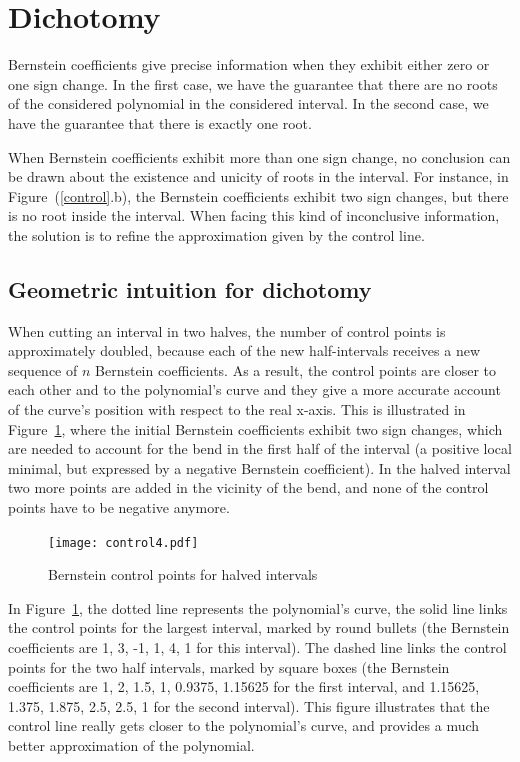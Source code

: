 \documentclass{mscs}
\begin{document}
\section{Dichotomy}

\label{sec:dicho}
Bernstein coefficients give precise information when they exhibit
either zero or one sign change. In the first case, we have the
guarantee that there are no roots of the considered polynomial in the
considered interval. In the second case, we have the guarantee that
there is exactly one root.

When Bernstein coefficients exhibit more than one sign change, no
conclusion can be drawn about the existence and unicity of roots in the
interval.  For instance, in Figure~(\ref{control}.b), the Bernstein
coefficients exhibit two sign changes, but there is no root inside the
interval.  When facing this kind of inconclusive information, the solution
is to refine the approximation given by the control line.

\subsection{Geometric intuition for dichotomy}
\label{ssec:dichogeom}
When cutting an interval in two halves, the number of control points is
approximately doubled, because each of the new half-intervals receives a
new sequence of \(n\) Bernstein coefficients.  As a result, the control points
are closer to each other and to the polynomial's curve and they give a more
accurate account of the curve's position with respect to the real
x-axis.  This is
illustrated in Figure~\ref{dichotomy-curve}, where the initial Bernstein
coefficients exhibit two sign changes, which are needed to account for the bend
in the first half of the interval (a positive local minimal, but expressed
by a negative Bernstein coefficient).  In the halved interval two more points
are added in the vicinity of the bend, and none of the control points have
to be negative anymore.
\begin{figure}
\begin{center}
\texttt{[image: control4.pdf]}
\caption{\label{dichotomy-curve}Bernstein control points for halved intervals}
\end{center}
\end{figure}

In Figure~\ref{dichotomy-curve}, the dotted line represents
the polynomial's curve, the solid line links the control points for
the largest interval, marked by round bullets (the Bernstein coefficients are
1, 3, -1, 1, 4, 1 for this interval).  The dashed line links the control points
for the two half intervals, marked by square boxes
(the Bernstein coefficients are 1, 2, 1.5, 1,
0.9375, 1.15625 for the first interval, and 1.15625, 1.375, 1.875, 2.5, 2.5,
1 for the second interval).  This figure illustrates that the control line
really gets closer to the polynomial's curve, and provides a much better
approximation of the polynomial.
\end{document}
